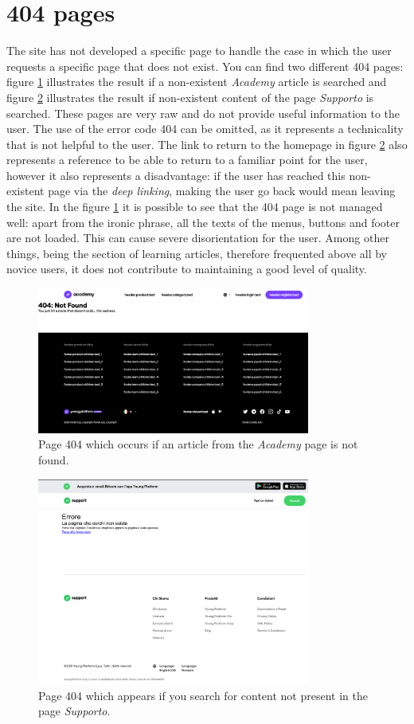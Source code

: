\section{404 pages}

The site has not developed a specific page to handle the case in which the 
user requests a specific page that does not exist. You can find two 
different 404 pages: figure \ref{fig:404-academy} illustrates the result 
if a non-existent \textit{Academy} article is searched and figure 
\ref{fig:404-support} illustrates the result if non-existent content of the 
page \textit{Supporto} is searched. These pages are very raw and do not 
provide useful information to the user. The use of the error code 404 can 
be omitted, as it represents a technicality that is not helpful to the 
user. The link to return to the homepage in figure \ref{fig:404-support} 
also represents a reference to be able to return to a familiar point for 
the user, however it also represents a disadvantage: if the user has reached 
this non-existent page via the \textit{deep linking}, making the user go 
back would mean leaving the site. In the figure \ref{fig:404-academy} it 
is possible to see that the 404 page is not managed well: apart from the 
ironic phrase, all the texts of the menus, buttons and footer are not 
loaded. This can cause severe disorientation for the user. Among other 
things, being the section of learning articles, therefore frequented 
above all by novice users, it does not contribute to maintaining a good 
level of quality.

\begin{figure}[H]
  \centering
  \includegraphics[width=0.80\textwidth]{res/images/404-academy.png}
  \caption{Page 404 which occurs if an article from the \textit{Academy} 
  page is not found.}
  \label{fig:404-academy}
\end{figure}

\begin{figure}[H]
  \centering
  \includegraphics[width=0.80\textwidth]{res/images/404-support.png}
  \caption{Page 404 which appears if you search for content not present 
  in the page \textit{Supporto}.}
  \label{fig:404-support}
\end{figure}